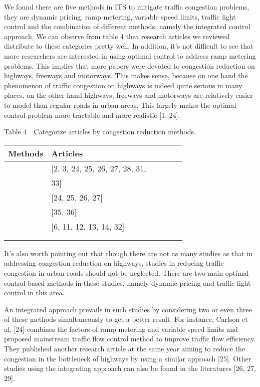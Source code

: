 \documentclass[12pt,onecolumn,twoside]{JCTA}
\theoremstyle{mystyle}
\begin{document}
We found there are five methods in ITS to mitigate traffic congestion problems, they are dynamic pricing, ramp metering, variable speed limits, traffic light control and the combination of different methods, namely the integrated control approach. We can observe from table 4 that research articles we reviewed distribute to these categories pretty well. In addition, it{\textquoteright}s not difficult to see that more researchers are interested in using optimal control to address ramp metering problems. This implies that more papers were devoted to congestion reduction on highways, freeways and motorways. This makes sense, because on one hand the phenomenon of traffic congestion on highways is indeed quite serious in many places, on the other hand highways, freeways and motorways are relatively easier to model than regular roads in urban areas. This largely makes the optimal control problem more tractable and more realistic [1, 24].

\begin{center}
{Table 4~~Categorize articles by congestion reduction methods.}\vskip 3pt
\small{\begin{tabular}{lll@{ }llc@{ }} \toprule
Methods & Articles \\\midrule
{} 
& [2, 3, 24, 25, 26, 27, 28, 31,\\
& 33] \\
\hline 
{}
& [24, 25, 26, 27]\\ 
\hline 
{}
& [35, 36]\\
\hline 
{}
& [6, 11, 12, 13, 14, 32]\\ \\ \\
\bottomrule
\end{tabular}}
\vskip 3pt
\end{center}

It{\textquoteright}s also worth pointing out that though there are not as many studies as that in addressing congestion reduction on highways, studies in reducing traffic congestion in urban roads should not be neglected. There are two main optimal control based methods in these studies, namely dynamic pricing and traffic light control in this area.

An integrated approach prevails in such studies by considering two or even three of these methods simultaneously to get a better result. For instance, Carlson et al. [24] combines the factors of ramp metering and variable speed limits and proposed mainstream traffic flow control method to improve traffic flow efficiency. They published another research article at the same year aiming to reduce the congestion in the bottleneck of highways by using a similar approach [25]. Other studies using the integrating approach can also be found in the literatures [26, 27, 29].
\end{document}
